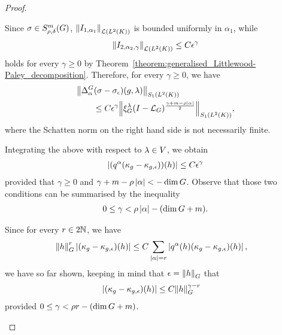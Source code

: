 \begin{proof}
\begin{description}
            Since $\sigma \in \SymbolClass m {\rho, \delta}$,
            $\norm [\Lin {\Lebesgue 2 \CompactGroup}] {I_{1, \alpha_1}}$ is bounded uniformly in $\alpha_1$,
            while
            \begin{align*}
                \norm [\Lin {\Lebesgue 2 \CompactGroup}] {I_{2, \alpha_2, \gamma}}
                \leq C \epsilon^\gamma
            \end{align*}
            holds for every $\gamma \geq 0$ by Theorem~\ref{theorem:generalised_Littlewood-Paley_decomposition}.
            Therefore, for every $\gamma \geq 0$, we have
            \begin{align*}
                &\norm [\SchattenClasses 1 {\Lebesgue 2 \CompactGroup}] {\DifferenceOperator \alpha (\sigma - \sigma_\epsilon)(g, \lambda)}\\
                & \qquad \leq C \epsilon^\gamma
                \norm [\SchattenClasses 1 {\Lebesgue 2 \CompactGroup}] {\Rep \lambda \BesselPotential {\gamma + m - \rho \abs \alpha}},
            \end{align*}
            where the Schatten norm on the right hand side is not necessarily finite.

            Integrating the above with respect to $\lambda \in \VectorSpace$,
            we obtain
            \begin{align*}
                \abs {(q^\alpha(\kappa_g - \kappa_{g, \epsilon}))(h)}
                \leq C \epsilon^\gamma
            \end{align*}
            provided that $\gamma \geq 0$ and $\gamma + m - \rho \abs \alpha < -\dim \Group$.
            Observe that those two conditions can be summarised by the inequality
            \begin{align*}
                0 \leq \gamma < \rho \abs \alpha - (\dim \Group + m).
            \end{align*}

            Since for every $r \in 2 \N$, we have
            \begin{align*}
                \norm [\Group] h^r \abs{(\kappa_g - \kappa_{g, \epsilon})(h)}
                &\leq C \sum_{\abs \alpha = r} \abs{q^\alpha(h) (\kappa_g - \kappa_{g, \epsilon})(h)},
            \end{align*}
            we have so far shown, keeping in mind that $\epsilon = \norm [\Group] h$ that
            \begin{align}
                \abs{(\kappa_g - \kappa_{g, \epsilon})(h)}
                &\leq C \norm [\Group] h^{\gamma - r}
                \label{eq:estimate_on_the_remainder}
            \end{align}
            provided $0 \leq \gamma < \rho r - (\dim \Group + m)$.


\end{description}
\end{proof}
